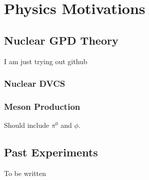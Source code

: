 
\chapter{Physics Motivations}
\label{chap:physics}

\section{Nuclear GPD Theory}
I am just trying out github

\subsection{Nuclear DVCS}

\subsection{Meson Production}

Should include $\pi^0$ and $\phi$.

\section{Past Experiments}
To be written

